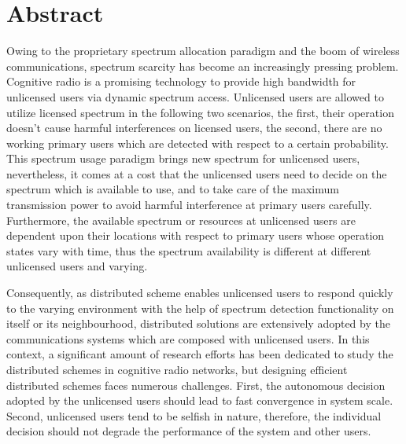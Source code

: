 \chapter{Abstract}
Owing to the proprietary spectrum allocation paradigm and the boom of wireless communications, spectrum scarcity has become an increasingly pressing problem. 
Cognitive radio is a promising technology to provide high bandwidth for unlicensed users via dynamic spectrum access. 
Unlicensed users are allowed to utilize licensed spectrum in the following two scenarios, the first, their operation doesn't cause harmful interferences on licensed users, the second, there are no working primary users which are detected with respect to a certain probability.
This spectrum usage paradigm brings new spectrum for unlicensed users, nevertheless, it comes at a cost that the unlicensed users need to decide on the spectrum which is available to use, and to take care of the maximum transmission power to avoid harmful interference at primary users carefully.
Furthermore, the available spectrum or resources at unlicensed users are dependent upon their locations with respect to primary users whose operation states vary with time, thus the spectrum availability is different at different unlicensed users and varying.

Consequently, as distributed scheme enables unlicensed users to respond quickly to the varying environment with the help of spectrum detection functionality on itself or its neighbourhood, distributed solutions are extensively adopted by the communications systems which are composed with unlicensed users.
In this context, a significant amount of research efforts has been dedicated to study the distributed schemes in cognitive radio networks, but designing efficient distributed schemes faces numerous challenges.
First, the autonomous decision adopted by the unlicensed users should lead to fast convergence in system scale.
Second, unlicensed users tend to be selfish in nature, therefore, the individual decision should not degrade the performance of the system and other users.

